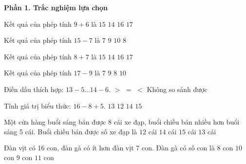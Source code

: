 \textbf{Phần 1. Trắc nghiệm lựa chọn}

\begin{ex} %
Kết quả của phép tính $9 + 6$ là
\choice
{\True $15$}
{$14$}
{$16$}
{$17$}
\end{ex}

\begin{ex} %
Kết quả của phép tính $15 - 7$ là
\choice
{$7$}
{$9$}
{$10$}
{\True $8$}
\end{ex}

\begin{ex} %
Kết quả của phép tính $8 + 7$ là
\choice
{\True $15$}
{$14$}
{$16$}
{$17$}
\end{ex}

\begin{ex} %
Kết quả của phép tính $17 - 9$ là
\choice
{$7$}
{$9$}
{\True $8$}
{$10$}
\end{ex}

\begin{ex} %
Điền dấu thích hợp: $13 - 5 \dots 14 - 6$.
\choice
{$>$}
{\True $=$}
{$<$}
{Không so sánh được}
\end{ex}

\begin{ex} %
Tính giá trị biểu thức: $16 - 8 + 5$.
\choice
{\True $13$}
{$12$}
{$14$}
{$15$}
\end{ex}

\begin{ex} %
Một cửa hàng buổi sáng bán được 8 cái xe đạp, buổi chiều bán nhiều hơn buổi sáng 5 cái. Buổi chiều bán được số xe đạp là
\choice
{$12$ cái}
{$14$ cái}
{$15$ cái}
{\True $13$ cái}
\end{ex}

\begin{ex} %
Đàn vịt có 16 con, đàn gà có ít hơn đàn vịt 7 con. Đàn gà có số con là
\choice
{$8$ con}
{$10$ con}
{\True $9$ con}
{$11$ con}
\end{ex}

